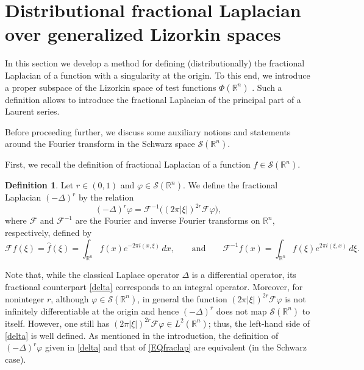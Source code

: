 \documentclass[reqno,11pt]{amsart}
\theoremstyle{definition}
\newtheorem{definition}[theorem]{Definition}
\def\R{\mathbb{R}}
\begin{document}
\section{Distributional fractional Laplacian over generalized Lizorkin spaces}\label{Lizorkin}

In this section we develop a method for defining (distributionally) the fractional Laplacian of a function with a singularity at the origin. To this end, we introduce a proper subspace of the Lizorkin space of test functions $\Phi(\mathbb{R}^n)$ \cite[p. 487]{SKM}. Such a definition allows to introduce the fractional Laplacian of the principal part of a Laurent series.


Before proceeding further, we discuss some auxiliary notions and statements around the Fourier transform in the Schwarz space $\mathcal{S}(\R^n)$.

First, we recall the definition of fractional Laplacian of a function $f \in \mathcal{S}(\mathbb{R}^n)$.
\begin{definition}\label{DEFfraclapschwarz} Let $r\in(0,1)$ and $\varphi\in \mathcal{S}(\mathbb{R}^n)$. We define the fractional Laplacian $(-\Delta)^r$ by the relation
	\begin{equation}
		\label{delta}
		(-\Delta)^{r}\varphi =\mathcal{F}^{-1}\big((2 \pi  |\xi|)^{2 r} \mathcal{F}\varphi\big),
	\end{equation}
	where $\mathcal{F}$ and $\mathcal{F}^{-1}$ are the Fourier and inverse Fourier transforms on $\R^{n}$, respectively, defined by
	\[
	\mathcal{F}f(\xi)=\widehat{f}(\xi)=\int_{\R^{n}} f(x)e^{-2 \pi i(x,\xi)}\, dx,\qquad \text{and}\qquad \mathcal{F}^{-1}f(x)=\int_{\R^{n}} f(\xi)e^{ 2 \pi i(\xi,x)}\, d\xi.
	\]	
\end{definition}
Note that, while the classical Laplace operator $\Delta$ is a differential operator, its fractional counterpart \eqref{delta} corresponds to an integral operator. Moreover, for noninteger $r$, although  $\varphi\in \mathcal{S}(\mathbb{R}^n)$, in general the function $(2 \pi |\xi|)^{2 r} \mathcal{F}\varphi$ is not infinitely differentiable at the origin and hence $(-\Delta)^r$ does not map $\mathcal{S}(\R^n)$ to itself. However, one still has $(2 \pi |\xi|)^{2 r} \mathcal{F}\varphi \in L^2(\R^n)$; thus, the left-hand side of \eqref{delta} is well defined. As mentioned in the introduction, the definition of $(-\Delta)^r\varphi$ given in \eqref{delta} and that of \eqref{EQfraclap} are equivalent (in the Schwarz case).
\end{document}
